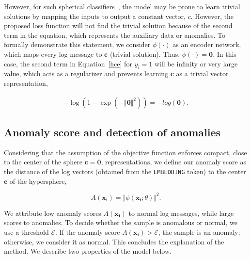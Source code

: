 However, for such spherical classifiers~\cite{ruff2019deep}, the model may be prone to learn trivial solutions by mapping the inputs to output a constant vector, $c$. However, the proposed loss function will not find the trivial solution because of the second term in the equation, which represents the auxiliary data or anomalies. To formally demonstrate this statement, we consider $\phi(\cdot)$ as an encoder network, which maps every log message to $\mathbf{c}$ (trivial solution). Thus, $\phi(\cdot)=\mathbf{0}$. In this case, the second term in Equation~\ref{hce} for $y_i=1$ will be infinity or very large value, which acts as a regularizer and prevents learning $\mathbf{c}$ as a trivial vector representation,

\begin{equation}\begin{aligned}
    -\log(1-\exp(-\Vert \mathbf{0} \Vert ^2))= -log(\mathbf{0}).
    \end{aligned}
\end{equation}\label{hcedecomposed}

\subsection{Anomaly score and detection of anomalies}
Considering that the assumption of the objective function enforces compact, close to the center of the sphere $\mathbf{c}=\mathbf{0}$, representations, we define our anomaly score as the distance of the log vectors (obtained from the \texttt{EMBEDDING} token) to the center $\textbf{c}$ of the hypersphere,

\begin{equation}
    A(\mathbf{x_i}) = \Vert \phi(\mathbf{x_i}; \theta) \Vert ^2.
\end{equation}

We attribute low anomaly scores $A(\mathbf{x_i})$ to normal log messages, while large scores to anomalies. To decide whether the sample is anomalous or normal, we use a threshold $\mathcal{E}$. If the anomaly score $A(\mathbf{x_i}) > \mathcal{E}$, the sample is an anomaly; otherwise, we consider it as normal. This concludes the explanation of the method. We describe two properties of the model below.


